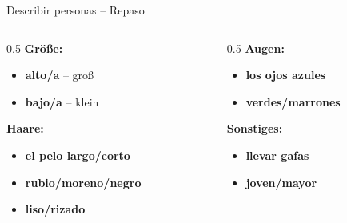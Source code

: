 \documentclass[aspectratio=169, 14pt]{beamer}
\newcommand{\es}[1]{\textbf{#1}}
\begin{document}
\begin{frame}{Describir personas – Repaso}

\begin{columns}
\begin{column}{0.5\textwidth}
\textbf{Größe:}
\begin{itemize}
    \item \es{alto/a} – groß
    \item \es{bajo/a} – klein
\end{itemize}

\vspace{0.5em}

\textbf{Haare:}
\begin{itemize}
    \item \es{el pelo largo/corto}
    \item \es{rubio/moreno/negro}
    \item \es{liso/rizado}
\end{itemize}
\end{column}

\begin{column}{0.5\textwidth}
\textbf{Augen:}
\begin{itemize}
    \item \es{los ojos azules}
    \item \es{verdes/marrones}
\end{itemize}

\vspace{0.5em}

\textbf{Sonstiges:}
\begin{itemize}
    \item \es{llevar gafas}
    \item \es{joven/mayor}
\end{itemize}
\end{column}
\end{columns}

\end{frame}
\end{document}
